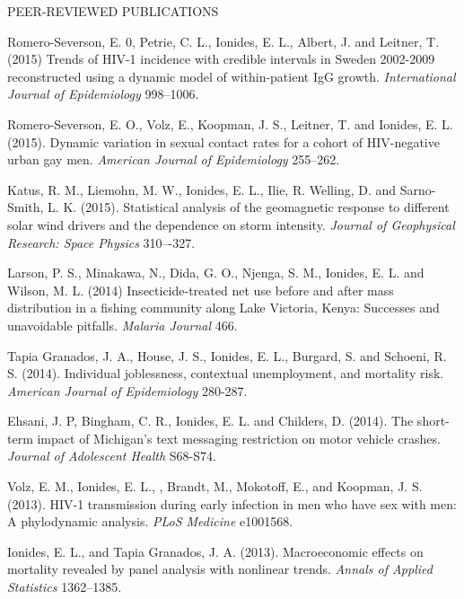 \begin{reflist}{PEER-REVIEWED PUBLICATIONS}
\item Romero-Severson, E. 0, Petrie, C. L., Ionides, E. L., Albert, J. and Leitner, T. (2015) Trends of HIV-1 incidence with credible intervals in Sweden 2002-2009 reconstructed using a dynamic model of within-patient IgG growth. {\em International Journal of Epidemiology} {}{\separator}998--1006.


\item Romero-Severson, E. O., Volz, E., Koopman, J. S., Leitner, T. and Ionides, E. L. (2015). Dynamic variation in sexual contact rates for a cohort of HIV-negative urban gay men. {\em American Journal of Epidemiology}  {} 255--262.

\item
Katus, R. M., Liemohn,  M. W.,  Ionides, E. L., Ilie, R. Welling, D. and Sarno-Smith, L. K. (2015). Statistical analysis of the geomagnetic response to different solar wind drivers and the dependence on storm intensity. {\em Journal of Geophysical Research: Space Physics} {}{\separator}310–-327. 


\item
Larson, P. S., Minakawa,  N., Dida,  G. O., Njenga,  S. M., Ionides,  E. L. and Wilson,  M. L. (2014)
Insecticide-treated net use before and after mass distribution in a fishing community along Lake Victoria, Kenya: Successes and unavoidable pitfalls.
{\em Malaria Journal} {}{\separator}466. 

\item\formal{[[\tapiaPNAS] ]} 
Tapia Granados, J. A.,  House, J. S., Ionides, E. L., Burgard, S. and Schoeni, R. S. (2014). Individual joblessness, contextual unemployment, and mortality risk. {\em American Journal of Epidemiology}  {}{\separator}280-287.

\item\formal{[[\ehsani] ]} 
Ehsani, J. P, Bingham, C. R., Ionides, E. L. and Childers, D. (2014). The short-term impact of Michigan's text messaging restriction on motor vehicle crashes. {\it Journal of Adolescent Health}  {}{\separator}S68-S74.

\item\formal{[[\volz] ] }
Volz, E. M., Ionides, E. L., , Brandt, M., Mokotoff, E., and Koopman, J. S. (2013). HIV-1 transmission during early infection in men who have sex with men: A phylodynamic analysis.
{\em PLoS Medicine} {}{\separator}e1001568.

\item\formal{[[\ionidesAOAS] ] }
Ionides, E. L.,  and Tapia Granados, J. A. 
(2013). 
Macroeconomic effects on mortality revealed by panel analysis with nonlinear trends. {\em Annals of Applied Statistics} {}{\separator}1362–1385.


\end{reflist}
